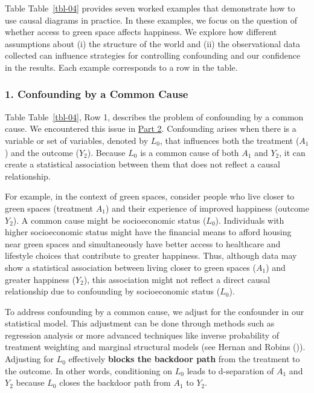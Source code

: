 \documentclass[
  singlecolumn]{article}
\begin{document}
Table Table~\ref{tbl-04} provides seven worked examples that demonstrate
how to use causal diagrams in practice. In these examples, we focus on
the question of whether access to green space affects happiness. We
explore how different assumptions about (i) the structure of the world
and (ii) the observational data collected can influence strategies for
controlling confounding and our confidence in the results. Each example
corresponds to a row in the table.

\begin{table}

\caption{\label{tbl-04}}


\end{table}%

\subsubsection{1. Confounding by a Common
Cause}\label{confounding-by-a-common-cause}

Table Table~\ref{tbl-04}, Row 1, describes the problem of confounding by
a common cause. We encountered this issue in
\hyperref[section-part2]{Part 2}. Confounding arises when there is a
variable or set of variables, denoted by \(L_0\), that influences both
the treatment (\(A_1\)) and the outcome (\(Y_2\)). Because \(L_0\) is a
common cause of both \(A_1\) and \(Y_2\), it can create a statistical
association between them that does not reflect a causal relationship.

For example, in the context of green spaces, consider people who live
closer to green spaces (treatment \(A_1\)) and their experience of
improved happiness (outcome \(Y_2\)). A common cause might be
socioeconomic status (\(L_0\)). Individuals with higher socioeconomic
status might have the financial means to afford housing near green
spaces and simultaneously have better access to healthcare and lifestyle
choices that contribute to greater happiness. Thus, although data may
show a statistical association between living closer to green spaces
(\(A_1\)) and greater happiness (\(Y_2\)), this association might not
reflect a direct causal relationship due to confounding by socioeconomic
status (\(L_0\)).

To address confounding by a common cause, we adjust for the confounder
in our statistical model. This adjustment can be done through methods
such as regression analysis or more advanced techniques like inverse
probability of treatment weighting and marginal structural models (see
Hernan and Robins ()). Adjusting
for \(L_0\) effectively \textbf{blocks the backdoor path} from the
treatment to the outcome. In other words, conditioning on \(L_0\) leads
to d-separation of \(A_1\) and \(Y_2\) because \(\boxed{L_0}\) closes
the backdoor path from \(A_1\) to \(Y_2\).
\end{document}
